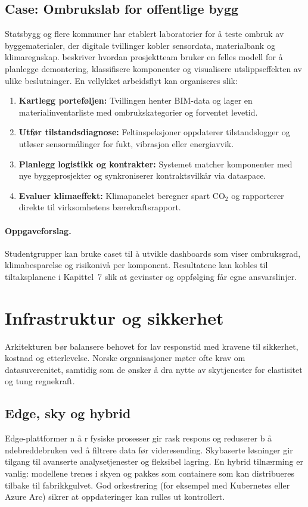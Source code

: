 \subsection{Case: Ombrukslab for offentlige bygg}
Statsbygg og flere kommuner har etablert laboratorier for å teste ombruk av byggematerialer, der digitale tvillinger kobler sensordata,
materialbank og klimaregnskap. \citet{statsbygg2022ombruk} beskriver hvordan prosjektteam bruker en felles modell for å planlegge demontering,
klassifisere komponenter og visualisere utslippseffekten av ulike beslutninger. En vellykket arbeidsflyt kan organiseres slik:
\begin{enumerate}
    \item \textbf{Kartlegg porteføljen:} Tvillingen henter BIM-data og lager en materialinventarliste med ombrukskategorier og forventet levetid.
    \item \textbf{Utfør tilstandsdiagnose:} Feltinspeksjoner oppdaterer tilstandslogger og utløser sensormålinger for fukt, vibrasjon eller energiavvik.
    \item \textbf{Planlegg logistikk og kontrakter:} Systemet matcher komponenter med nye byggeprosjekter og synkroniserer kontraktsvilkår via dataspace.
    \item \textbf{Evaluer klimaeffekt:} Klimapanelet beregner spart CO$_2$ og rapporterer direkte til virksomhetens bærekraftsrapport.
\end{enumerate}

\paragraph{Oppgaveforslag.} Studentgrupper kan bruke caset til å utvikle dashboards som viser ombruksgrad, klimabesparelse og risikonivå per komponent.
Resultatene kan kobles til tiltaksplanene i Kapittel~7 slik at gevinster og oppfølging får egne ansvarslinjer.

\section{Infrastruktur og sikkerhet}
Arkitekturen bør balansere behovet for lav responstid med kravene til sikkerhet, kostnad og etterlevelse. Norske organisasjoner møter ofte krav om datasuverenitet, samtidig som de ønsker  å dra nytte av skytjenester for elastisitet og tung regnekraft.

\subsection{Edge, sky og hybrid}
Edge-plattformer n å r fysiske prosesser gir rask respons og reduserer b å ndebreddebruken ved  å filtrere data før videresending. Skybaserte løsninger gir tilgang til avanserte analysetjenester og fleksibel lagring. En hybrid tilnærming er vanlig: modellene trenes i skyen og pakkes som containere som kan distribueres tilbake til fabrikkgulvet. God orkestrering (for eksempel med Kubernetes eller Azure Arc) sikrer at oppdateringer kan rulles ut kontrollert.

